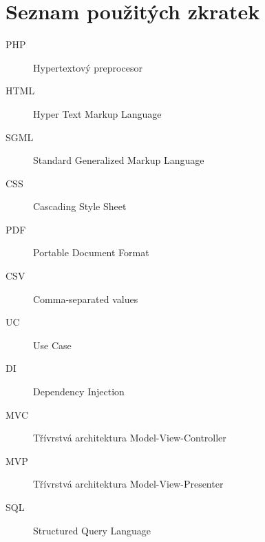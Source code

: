 \documentclass[czech,BP]{thesiskiv}
\begin{document}
\chapter*{Seznam použitých zkratek}
\begin{description}
	\item[PHP] Hypertextový preprocesor
	\item[HTML] Hyper Text Markup Language
	\item[SGML] Standard Generalized Markup Language
	\item[CSS] Cascading Style Sheet
	\item[PDF] Portable Document Format
	\item[CSV] Comma-separated values
	\item[UC] Use Case
	\item[DI] Dependency Injection
	\item[MVC] Třívrstvá architektura Model-View-Controller
	\item[MVP] Třívrstvá architektura Model-View-Presenter
	\item[SQL] Structured Query Language
\end{description}
%

\end{document}
